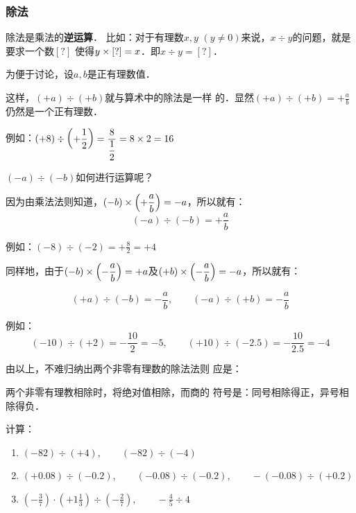 \subsubsection{除法}
除法是乘法的\textbf{逆运算}． 比如：对于有理数$x,  y$
 $(y\ne 0)$来说，$x\div y$的问题，就是要求一个数$[?]$
使得$y\times[?]=x$．即$x\div y=[?]$．

为便于讨论，设$a,b$是正有理数值．

这样，$(+a) \div (+b)$就与算术中的除法是一样
的．显然$(+a)\div (+b)=+\frac{a}{b}$仍然是一个正有理数．
                    
例如：$(+8)\div\left(+\dfrac{1}{2}\right)=\dfrac{8}{\dfrac{1}{2}}=8\times 2=16$

$(-a) \div (-b)$如何进行运算呢？

因为由乘法法则知道，$(-b)\times \left(+\dfrac{a}{b}\right)=-a$，所以就有：
\[(-a) \div (-b)=+\frac{a}{b}\]

例如：$(-8)\div (-2)=+\frac{8}{2}=+4$

同样地，由于$(-b)\times \left(-\dfrac{a}{b}\right)=+a$及$(+b)\times \left(-\dfrac{a}{b}\right)=-a$，所以就有：

\[(+a)\div (-b)=-\frac{a}{b},\qquad   (-a)\div (+b)=-\frac{a}{b}\]

例如：
\[(-10)\div (+2)=-\frac{10}{2}=-5 ,\qquad(+10)\div (-2.5)=-\frac{10}{2.5}=-4\]

由以上，不难归纳出两个非零有理数的除法法则
应是：

\begin{blk}{}
    两个非零有理教相除时，将绝对值相除，而商的
符号是：同号相除得正，异号相除得负．
\end{blk}
    
\begin{example}
计算：
\begin{enumerate}
    \item $(-82)\div (+4),\qquad (-82)\div (-4)$
    \item $(+0.08)\div (-0.2),\qquad (-0.08)\div (-0.2),\qquad -(-0.08)\div (+0.2)$
    \item $\left(-\frac{3}{7}\right)\cdot \left(+1\frac{1}{3}\right)\div \left(-\frac{2}{7}\right),\qquad -\frac{4}{5}\div 4$
\end{enumerate}
\end{example}

